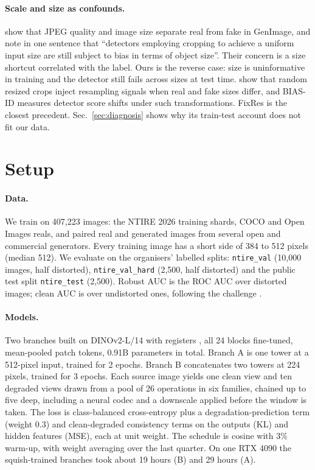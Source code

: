 \documentclass[letterpaper]{article} %
\begin{document}
\paragraph{Scale and size as confounds.} \citet{grommelt2024fakeorjpeg}
show that JPEG quality and image size
separate real from fake in GenImage, and note in one sentence that
``detectors employing cropping to achieve a uniform input size are still
subject to bias in terms of object size''. Their concern is a size shortcut
correlated with the label. Ours is the reverse case: size is uninformative in
training and the detector still fails across sizes at test time. \citet{rajan2025aligned}
show that random resized crops inject
resampling signals when real and fake sizes differ, and BIAS-ID \cite{ricker2026biasid}
measures detector score shifts under such transformations. FixRes \cite{touvron2019fixres}
is the closest precedent. Sec.~\ref{sec:diagnosis} shows why its train-test
account does not fit our data.

\section{Setup}
\label{sec:setup}

\paragraph{Data.} We train on 407,223 images: the NTIRE 2026 training shards,
COCO and Open Images reals, and paired real and generated images from several
open and commercial generators. Every training image has a short side of 384 to
512 pixels (median 512). We evaluate on the organisers' labelled splits:
\texttt{ntire\_val} (10,000 images, half distorted), \texttt{ntire\_val\_hard}
(2,500, half distorted) and the public test split \texttt{ntire\_test}
(2,500). Robust AUC is the ROC AUC over distorted images; clean AUC is over
undistorted ones, following the challenge \cite{gushchin2026ntire}.

\paragraph{Models.} Two branches built on DINOv2-L/14 with
registers \cite{oquab2024dinov2,darcet2024registers}, all 24 blocks
fine-tuned, mean-pooled patch tokens, 0.91B parameters in total. Branch A is
one tower at a 512-pixel input, trained for 2 epochs. Branch B concatenates
two towers at 224 pixels, trained for 3 epochs. Each source image yields one
clean view and ten degraded views drawn from a pool of 26 operations in six
families, chained up to five deep, including a neural codec \cite{balle2018hyperprior}
and a downscale applied before the window is taken. The loss is
class-balanced cross-entropy plus a degradation-prediction term (weight 0.3)
and clean-degraded consistency terms on the outputs (KL) and hidden
features (MSE), each at unit weight. The schedule is cosine with 3\% warm-up, with weight
averaging \cite{izmailov2018swa} over the last quarter. On one RTX 4090 the
squish-trained branches took about 19 hours (B) and 29 hours (A).
\end{document}
